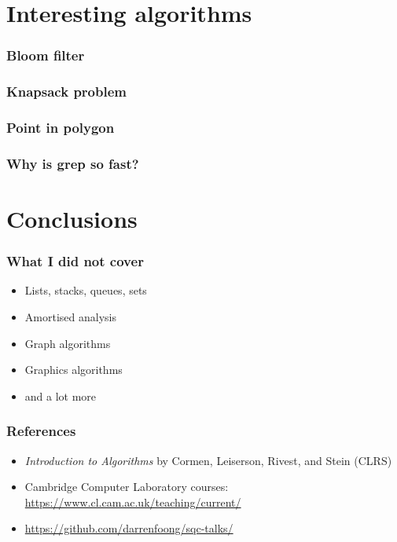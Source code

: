 \documentclass{beamer}
\begin{document}
\section{Interesting algorithms}

\begin{frame}
 \frametitle{Bloom filter}
\end{frame}

\begin{frame}
 \frametitle{Knapsack problem}
\end{frame}

\begin{frame}
 \frametitle{Point in polygon}
\end{frame}

\begin{frame}
 \frametitle{Why is grep so fast?}
\end{frame}

\section{Conclusions}

\begin{frame}
 \frametitle{What I did not cover}
 \begin{itemize}
  \item Lists, stacks, queues, sets
  \item Amortised analysis
  \item Graph algorithms
  \item Graphics algorithms
  \item and a lot more
 \end{itemize}
\end{frame}

\begin{frame}
 \frametitle{References}
 \begin{itemize}
  \item \emph{Introduction to Algorithms} by Cormen, Leiserson, Rivest, and Stein (CLRS)
  \item Cambridge Computer Laboratory courses: \url{https://www.cl.cam.ac.uk/teaching/current/}
  \item \url{https://github.com/darrenfoong/sqc-talks/}
 \end{itemize}
\end{frame}
\end{document}
